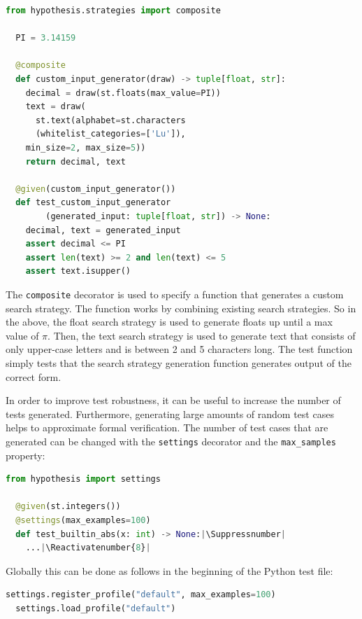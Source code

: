 \documentclass[runningheads]{llncs}
\makeatletter
\let\origthelstnumber\thelstnumber
\newcommand*\Suppressnumber{%
  \lst@AddToHook{OnNewLine}{%
    \let\thelstnumber\relax%
     \advance\c@lstnumber-\@ne\relax%
    }%
}
\newcommand*\Reactivatenumber[1]{%
  \setcounter{lstnumber}{\numexpr#1-1\relax}
  \lst@AddToHook{OnNewLine}{%
   \let\thelstnumber\origthelstnumber%
   \refstepcounter{lstnumber}%
  }%
}
\makeatother
\begin{document}
\begin{lstlisting}[language=Python,caption={Complex Inputs from code/tutorial.ipynb}]
  from hypothesis.strategies import composite

  PI = 3.14159

  @composite
  def custom_input_generator(draw) -> tuple[float, str]:
    decimal = draw(st.floats(max_value=PI))
    text = draw(
      st.text(alphabet=st.characters
      (whitelist_categories=['Lu']), 
    min_size=2, max_size=5))
    return decimal, text

  @given(custom_input_generator())
  def test_custom_input_generator
        (generated_input: tuple[float, str]) -> None:
    decimal, text = generated_input
    assert decimal <= PI
    assert len(text) >= 2 and len(text) <= 5
    assert text.isupper()
\end{lstlisting}
The \texttt{composite} decorator is used to specify a function that generates a custom search strategy. The function works by combining existing search strategies. So in the above, the float search strategy is used to generate floats up until a max value of $\pi$. Then, the text search strategy is used to generate text that consists of only upper-case letters and is between 2 and 5 characters long. The test function simply tests that the search strategy generation function generates output of the correct form.

\vspace{5mm}
\noindent In order to improve test robustness, it can be useful to increase the number of tests generated. Furthermore, generating large amounts of random test cases helps to approximate formal verification. The number of test cases that are generated can be changed with the \texttt{settings} decorator and the \texttt{max\_samples} property:

\begin{lstlisting}[language=Python,caption={Configuring Number of Generated Test Cases from code/tutorial.ipynb}]
  from hypothesis import settings

  @given(st.integers())
  @settings(max_examples=100)
  def test_builtin_abs(x: int) -> None:|\Suppressnumber|
    ...|\Reactivatenumber{8}|

\end{lstlisting}

\noindent Globally this can be done as follows in the beginning of the Python test file:
\begin{lstlisting}[language=Python,caption={Configuring Number of Generated Test Cases from code/tutorial.ipynb}]
  settings.register_profile("default", max_examples=100)
  settings.load_profile("default")
\end{lstlisting}
\end{document}
